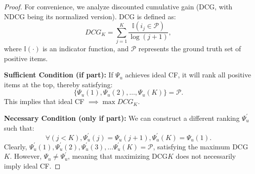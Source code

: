\begin{proof} 
For convenience, we analyze discounted cumulative gain (DCG, with NDCG being its normalized version). DCG is defined as:
\begin{equation}
    DCG_{K} = \sum^{K}_{j=1} \frac{\mathbb{I}(i_{j} \in \mathcal{P})}{\log(j+1)}, 
\end{equation}
where $\mathbb{I}(\cdot)$ is an indicator function, and $\mathcal{P}$ represents the ground truth set of positive items.

\textbf{Sufficient Condition (if part):} If $\Psi_u$ achieves ideal CF, it will rank all positive items at the top, thereby satisfying:
\begin{equation}
\{\Psi_u(1), \Psi_u(2), \ldots, \Psi_u(K)\} = \mathcal{P}.
\end{equation}
This implies that ideal CF $\implies \max DCG_{K}$.

\textbf{Necessary Condition (only if part):}
We can construct a different ranking $\Psi_u^{\prime}$ such that:
\begin{equation}
\forall (j<K), \Psi_u^{\prime}(j) = \Psi_u(j+1), \Psi_u^{\prime}(K)= \Psi_u(1).
\end{equation}
Clearly, ${\Psi_u^{\prime}(1),\Psi_u^{\prime}(2),\Psi_u^{\prime}(3),\ldots \Psi_u^{\prime}(K)} = \mathcal{P}$, satisfying the maximum DCG${K}$. However, $\Psi_u \neq \Psi_u^{\prime}$, meaning that maximizing DCG${K}$ does not necessarily imply ideal CF.
\end{proof}
